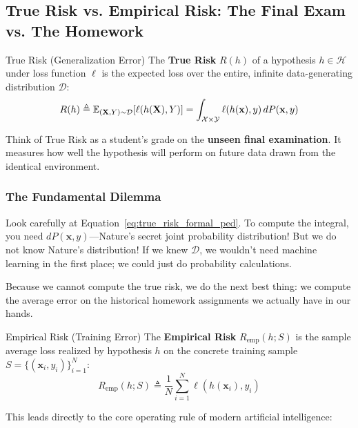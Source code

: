 \subsection{True Risk vs. Empirical Risk: The Final Exam vs. The Homework}

\begin{definitionbox}{True Risk (Generalization Error)}
The \textbf{True Risk} $R(h)$ of a hypothesis $h \in \mathcal{H}$ under loss function $\ell$ is the expected loss over the entire, infinite data-generating distribution $\mathcal{D}$:
\begin{equation}
R(h) \triangleq \operatorname{\mathbb{E}}_{(\mathbf{X}, Y) \sim \mathcal{D}} [\ell(h(\mathbf{X}), Y)] = \int_{\mathcal{X} \times \mathcal{Y}} \ell(h(\mathbf{x}), y) \, dP(\mathbf{x}, y)
\label{eq:true_risk_formal_ped}
\end{equation}
\end{definitionbox}

Think of True Risk as a student's grade on the \textbf{unseen final examination}. It measures how well the hypothesis will perform on future data drawn from the identical environment.

\subsubsection{The Fundamental Dilemma}
Look carefully at Equation~\eqref{eq:true_risk_formal_ped}. To compute the integral, you need $dP(\mathbf{x}, y)$—Nature's secret joint probability distribution! But we do not know Nature's distribution! If we knew $\mathcal{D}$, we wouldn't need machine learning in the first place; we could just do probability calculations.

Because we cannot compute the true risk, we do the next best thing: we compute the average error on the historical homework assignments we actually have in our hands.

\begin{definitionbox}{Empirical Risk (Training Error)}
The \textbf{Empirical Risk} $R_{\text{emp}}(h; S)$ is the sample average loss realized by hypothesis $h$ on the concrete training sample $S = \{(\mathbf{x}_i, y_i)\}_{i=1}^N$:
\begin{equation}
R_{\text{emp}}(h; S) \triangleq \frac{1}{N} \sum_{i=1}^N \ell(h(\mathbf{x}_i), y_i)
\label{eq:emp_risk_formal_ped}
\end{equation}
\end{definitionbox}

This leads directly to the core operating rule of modern artificial intelligence:

